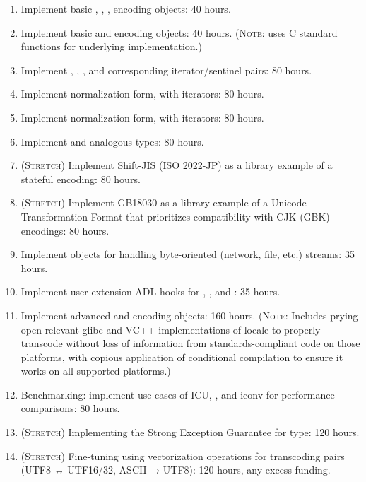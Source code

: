 \documentclass{wg21}
\begin{document}
\begin{enumerate}
	\item Implement basic , , ,  encoding objects: 40 hours.
	\item Implement basic  and  encoding objects: 40 hours. (\textsc{Note}: uses C standard functions for underlying implementation.)
	\item Implement , , , and corresponding iterator/sentinel pairs: 80 hours.
	\item Implement  normalization form, with iterators: 80 hours.
	\item Implement  normalization form, with iterators: 80 hours.
	\item Implement  and  analogous types: 80 hours.
	\item (\textsc{Stretch}) Implement Shift-JIS (ISO 2022-JP) as a library example of a stateful encoding: 80 hours.
	\item (\textsc{Stretch}) Implement GB18030 as a library example of a Unicode Transformation Format that prioritizes compatibility with CJK (GBK) encodings: 80 hours.
	\item Implement  objects for handling byte-oriented (network, file, etc.) streams: 35 hours.
	\item Implement user extension ADL hooks for , ,  and : 35 hours.
	\item Implement advanced  and  encoding objects: 160 hours. (\textsc{Note}: Includes prying open relevant glibc and VC++ implementations of locale to properly transcode without loss of information from standards-compliant code on those platforms, with copious application of conditional compilation to ensure it works on all supported platforms.)
	\item Benchmarking: implement use cases of ICU\cite{icu}, \cite{encoding_rs}, and iconv\cite{iconv} for performance comparisons: 80 hours.
	\item (\textsc{Stretch}) Implementing the Strong Exception Guarantee for  type: 120 hours.
	\item (\textsc{Stretch}) Fine-tuning using vectorization operations for transcoding pairs (UTF8 ↔ UTF16/32, ASCII → UTF8): 120 hours, any excess funding.

\end{enumerate}
\end{document}
